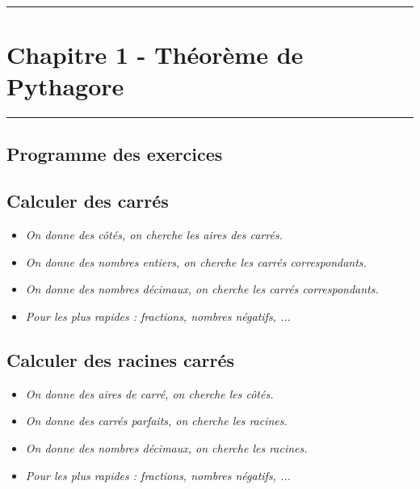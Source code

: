 \documentclass[12pt]{article}
\newcommand{\horrule}[1]{\rule{\linewidth}{#1}} %
\begin{document}

\newtheorem{Definition}{Définition}
\newtheorem{Theorem}{Théorème}
\newtheorem{Proposition}{Propriété}

\renewcommand{\labelitemi}{$\bullet$}
\renewcommand{\labelitemii}{$\circ$}

\setlength{\columnseprule}{1pt}

\horrule{2px}
\section*{Chapitre 1 - Théorème de Pythagore}
\horrule{2px}

\subsection*{Programme des exercices}

\subsection*{Calculer des carrés}

\begin{itemize}
	\item \textit{On donne des côtés, on cherche les aires des carrés.}
	\item \textit{On donne des nombres entiers, on cherche les carrés correspondants.}
	\item \textit{On donne des nombres décimaux, on cherche les carrés correspondants.}
	\item \textit{Pour les plus rapides : fractions, nombres négatifs, ...}
\end{itemize}

\subsection*{Calculer des racines carrés}

\begin{itemize}
	\item \textit{On donne des aires de carré, on cherche les côtés.}
	\item \textit{On donne des carrés parfaits, on cherche les racines.}
	\item \textit{On donne des nombres décimaux, on cherche les racines.}
	\item \textit{Pour les plus rapides : fractions, nombres négatifs, ...}
\end{itemize}
\end{document}
